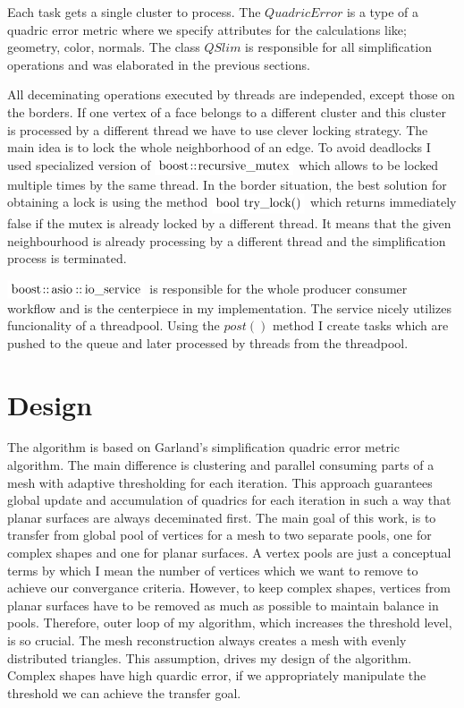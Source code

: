 Each task gets a single cluster to process. The $QuadricError$ is a type of a quadric error metric where we specify attributes for the calculations like; geometry, color, normals. The class $QSlim$ is responsible for all simplification operations and was elaborated in the previous sections.

All deceminating operations executed by threads are independed, except those on the borders. If one vertex of a face belongs to a different cluster and this cluster is processed by a different thread we have to use clever locking strategy. The main idea is to lock the whole neighborhood of an edge. To avoid deadlocks I used specialized version of $\inlinecode{Java}{boost::recursive_mutex}$ which allows to be locked multiple times by the same thread. In the border situation, the best solution for obtaining a lock is using the method $\inlinecode{Java}{bool try_lock()}$ which returns immediately false if the mutex is already locked by a different thread. It means that the given neighbourhood is already processing by a different thread and the simplification process is terminated.

$\inlinecode{Java}{boost::asio::io_service}$ is responsible for the whole producer consumer workflow and is the centerpiece in my implementation. The service nicely utilizes funcionality of a threadpool. Using the $post()$ method I create tasks which are pushed to the queue and later processed by threads from the threadpool.

\newpage
\section{Design}

The algorithm is based on Garland's simplification quadric error metric algorithm. The main difference is clustering and parallel consuming parts of a mesh with adaptive thresholding for each iteration. This approach guarantees global update and accumulation of quadrics for each iteration in such a way that planar surfaces are always deceminated first. The main goal of this work, is to transfer from global pool of vertices for a mesh to two separate pools, one for complex shapes and one for planar surfaces. A vertex pools are just a conceptual terms by which I mean the number of vertices which we want to remove to achieve our convergance criteria. However, to keep complex shapes, vertices from planar surfaces have to be removed as much as possible to maintain balance in pools. Therefore, outer loop of my algorithm, which increases the threshold level, is so crucial. The mesh reconstruction always creates a mesh with evenly distributed triangles. This assumption, drives my design of the algorithm. Complex shapes have high quardic error, if we appropriately manipulate the threshold we can achieve the transfer goal.

